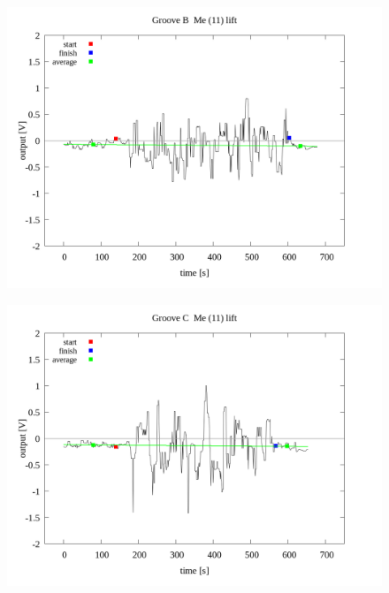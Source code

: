 \documentclass[a4paper]{jsarticle}
\begin{document}
\begin{figure}[htbp]
    \footnotesize
    \begin{center}
        \includegraphics[width=140mm]{../../../../33_result/210806/median/11/lift/03/Groove_B_me(11)_lift_03.png}
    \end{center}
\end{figure}

\begin{figure}[htbp]
    \footnotesize
    \begin{center}
        \includegraphics[width=140mm]{../../../../33_result/210806/median/11/lift/03/Groove_C_me(11)_lift_03.png}
    \end{center}
\end{figure}
\end{document}
